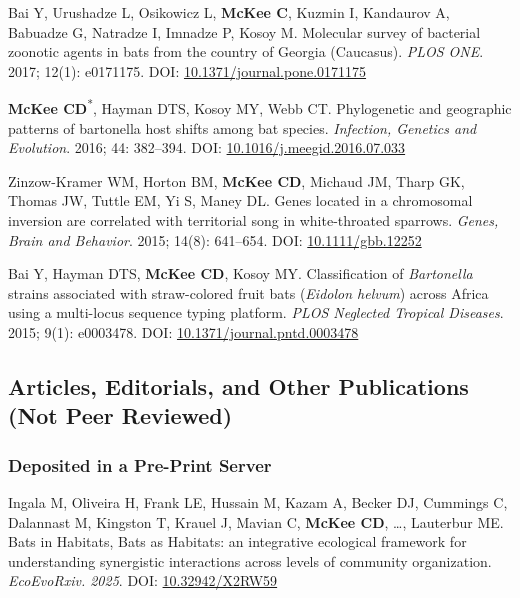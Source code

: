 \documentclass{cv}
\begin{document}
\begin{pubenum}
\item Bai Y, Urushadze L, Osikowicz L, \textbf{McKee C}, Kuzmin I, Kandaurov A, Babuadze G, Natradze I, Imnadze P, Kosoy M. Molecular survey of bacterial zoonotic agents in bats from the country of Georgia (Caucasus). \textit{PLOS ONE}. 2017; 12(1): e0171175. DOI: \href{https://doi.org/10.1371/journal.pone.0171175}{10.1371/journal.pone.0171175}

\item \textbf{McKee CD}\textsuperscript{*}, Hayman DTS, Kosoy MY, Webb CT. Phylogenetic and geographic patterns of bartonella host shifts among bat species. \textit{Infection, Genetics and Evolution}. 2016; 44: 382--394. DOI: \href{https://doi.org/10.1016/j.meegid.2016.07.033}{10.1016/j.meegid.2016.07.033}

\item Zinzow-Kramer WM, Horton BM, \textbf{McKee CD}, Michaud JM, Tharp GK, Thomas JW, Tuttle EM, Yi S, Maney DL. Genes located in a chromosomal inversion are correlated with territorial song in white-throated sparrows. \textit{Genes, Brain and Behavior}. 2015; 14(8): 641--654. DOI: \href{https://doi.org/10.1111/gbb.12252}{10.1111/gbb.12252}

\item Bai Y, Hayman DTS, \textbf{McKee CD}, Kosoy MY. Classification of \textit{Bartonella} strains associated with straw-colored fruit bats (\textit{Eidolon helvum}) across Africa using a multi-locus sequence typing platform. \textit{PLOS Neglected Tropical Diseases}. 2015; 9(1): e0003478. DOI: \href{https://doi.org/10.1371/journal.pntd.0003478}{10.1371/journal.pntd.0003478}

\end{pubenum}

\subsection*{Articles, Editorials, and Other Publications (Not Peer Reviewed)}

\subsubsection*{Deposited in a Pre-Print Server}

\begin{pubenum}

\item Ingala M, Oliveira H, Frank LE, Hussain M, Kazam A, Becker DJ, Cummings C, Dalannast M, Kingston T, Krauel J, Mavian C, \textbf{McKee CD}, …, Lauterbur ME. Bats in Habitats, Bats as Habitats: an integrative ecological framework for understanding synergistic interactions across levels of community organization. \textit{EcoEvoRxiv. 2025}. DOI: \href{https://doi.org/10.32942/X2RW59}{10.32942/X2RW59}

 \end{pubenum}
\end{document}
